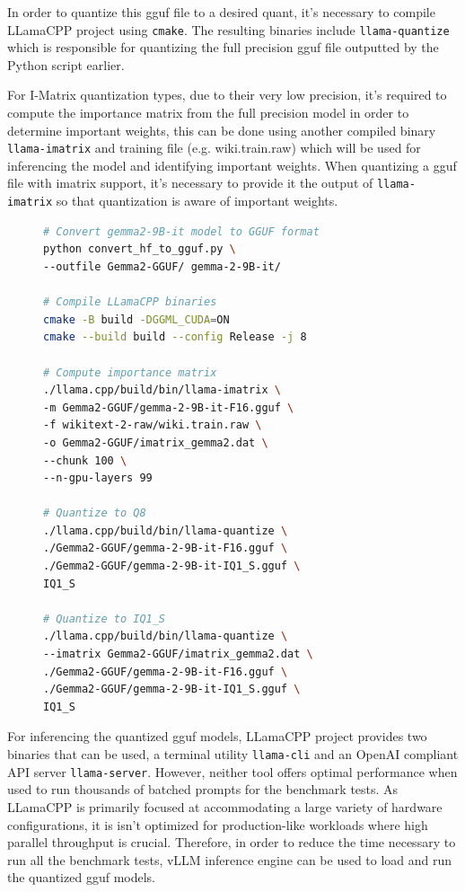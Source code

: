 \documentclass{ifacconf}
\begin{document}
    In order to quantize this \gls{gguf} file to a desired quant, it's necessary to compile LLamaCPP project using \verb|cmake|. The resulting binaries include \verb|llama-quantize| which is responsible for quantizing the full precision \gls{gguf} file outputted by the Python script earlier. 
    
    For I-Matrix quantization types, due to their very low precision, it's required to compute the importance matrix from the full precision model in order to determine important weights, this can be done using another compiled binary \verb|llama-imatrix| and training file (e.g. wiki.train.raw) which will be used for inferencing the model and identifying important weights. When quantizing a \gls{gguf} file with imatrix support, it's necessary to provide it the output of \verb|llama-imatrix| so that quantization is aware of important weights.

    \begin{figure}[H]
        \centering
    \begin{lstlisting}[language=bash,numbers=none]
# Convert gemma2-9B-it model to GGUF format
python convert_hf_to_gguf.py \
--outfile Gemma2-GGUF/ gemma-2-9B-it/

# Compile LLamaCPP binaries
cmake -B build -DGGML_CUDA=ON
cmake --build build --config Release -j 8

# Compute importance matrix
./llama.cpp/build/bin/llama-imatrix \
-m Gemma2-GGUF/gemma-2-9B-it-F16.gguf \
-f wikitext-2-raw/wiki.train.raw \
-o Gemma2-GGUF/imatrix_gemma2.dat \
--chunk 100 \
--n-gpu-layers 99

# Quantize to Q8
./llama.cpp/build/bin/llama-quantize \
./Gemma2-GGUF/gemma-2-9B-it-F16.gguf \
./Gemma2-GGUF/gemma-2-9B-it-IQ1_S.gguf \
IQ1_S

# Quantize to IQ1_S
./llama.cpp/build/bin/llama-quantize \
--imatrix Gemma2-GGUF/imatrix_gemma2.dat \
./Gemma2-GGUF/gemma-2-9B-it-F16.gguf \
./Gemma2-GGUF/gemma-2-9B-it-IQ1_S.gguf \
IQ1_S
    \end{lstlisting}
    \label{gguf-command}
    \end{figure}

    For inferencing the quantized \gls{gguf} models, LLamaCPP project provides two binaries that can be used, a terminal utility \verb|llama-cli| and an OpenAI compliant API server \verb|llama-server|. However, neither tool offers optimal performance when used to run thousands of batched prompts for the benchmark tests. As LLamaCPP is primarily focused at accommodating a large variety of hardware configurations, it is isn't optimized for production-like workloads where high parallel throughput is crucial. Therefore, in order to reduce the time necessary to run all the benchmark tests, vLLM \cite{vllm} inference engine can be used to load and run the quantized \gls{gguf} models.
    
\end{document}
